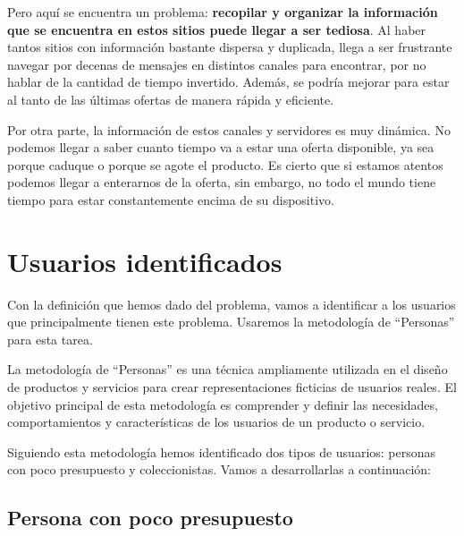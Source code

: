 Pero aquí se encuentra un problema: \textbf{recopilar y organizar la información 
que se encuentra en estos sitios puede llegar a ser tediosa}. Al haber tantos 
sitios con información bastante dispersa y duplicada, llega a ser frustrante 
navegar por decenas de mensajes en distintos canales para encontrar, por no hablar 
de la cantidad de tiempo invertido. Además, se podría mejorar para estar al tanto 
de las últimas ofertas de manera rápida y eficiente.

Por otra parte, la información de estos canales y servidores es muy dinámica. No 
podemos llegar a saber cuanto tiempo va a estar una oferta disponible, ya sea 
porque caduque o porque se agote el producto. Es cierto que si estamos atentos 
podemos llegar a enterarnos de la oferta, sin embargo, no todo el mundo tiene tiempo 
para estar constantemente encima de su dispositivo.

\section{Usuarios identificados}

Con la definición que hemos dado del problema, vamos a identificar a los usuarios 
que principalmente tienen este problema. Usaremos la metodología de ``Personas'' para 
esta tarea.

La metodología de ``Personas'' es una técnica ampliamente utilizada en el diseño de 
productos y servicios para crear representaciones ficticias de usuarios reales. El 
objetivo principal de esta metodología es comprender y definir las necesidades, 
comportamientos y características de los usuarios de un producto o servicio.

Siguiendo esta metodología hemos identificado dos tipos de usuarios: personas con 
poco presupuesto y coleccionistas. Vamos a desarrollarlas a continuación:

\subsection{Persona con poco presupuesto}

